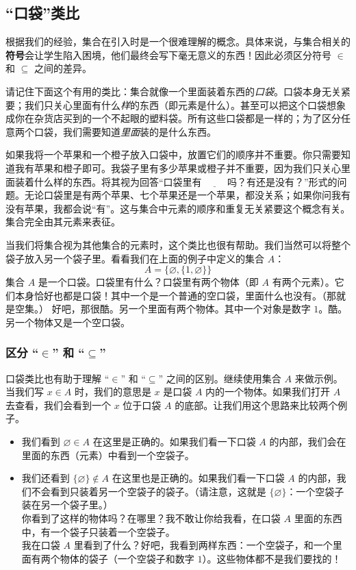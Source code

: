 \subsection{``口袋''类比}\label{sec:section3.4.4}

根据我们的经验，集合在引入时是一个很难理解的概念。具体来说，与集合相关的\textbf{符号}会让学生陷入困境，他们最终会写下毫无意义的东西！因此必须区分符号 $\in$ 和 $\subseteq$ 之间的差异。

请记住下面这个有用的类比：集合就像一个里面装着东西的\emph{口袋}。口袋本身无关紧要；我们只关心里面有什么\emph{样}的东西（即元素是什么）。甚至可以把这个口袋想象成你在杂货店买到的一个不起眼的塑料袋。所有这些口袋都是一样的；为了区分任意两个口袋，我们需要知道\emph{里面}装的是什么东西。

如果我将一个苹果和一个橙子放入口袋中，放置它们的顺序并不重要。你只需要知道我有苹果和橙子即可。我袋子里有多少苹果或橙子并不重要，因为我们只关心里面装着什么样的东西。将其视为回答``口袋里有 $\underline{\qquad}$ 吗？有还是没有？''形式的问题。无论口袋里是有两个苹果、七个苹果还是一个苹果，都没关系；如果你问我有没有苹果，我都会说``有''。这与集合中元素的顺序和重复无关紧要这个概念有关。集合完全由其元素来表征。

当我们将集合视为其他集合的元素时，这个类比也很有帮助。我们当然可以将整个袋子放入另一个袋子里。看看我们在上面的例子中定义的集合 $A$：
\[A = \{\varnothing, \{1, \varnothing\}\}\]
集合 $A$ 是一个口袋。口袋里有什么？口袋里有两个物体（即 $A$ 有两个元素）。它们本身恰好也都是口袋！其中一个是一个普通的空口袋，里面什么也没有。（那就是空集。） 好吧，那很酷。另一个里面有两个物体。其中一个对象是数字 $1$。酷。另一个物体又是一个空口袋。

\subsubsection*{区分 ``$\in$'' 和 ``$\subseteq$''}

口袋类比也有助于理解 ``$\in$'' 和 ``$\subseteq$'' 之间的区别。继续使用集合 $A$ 来做示例。当我们写 $x \in A$ 时，我们的意思是 $x$ 是口袋 $A$ 内的一个物体。如果我们打开 $A$ 去查看，我们会看到一个 $x$ 位于口袋 $A$ 的底部。让我们用这个思路来比较两个例子。

\begin{itemize}
    \item 我们看到 $\varnothing \in A$ 在这里是正确的。如果我们看一下口袋 $A$ 的内部，我们会在里面的东西（元素）中看到一个空袋子。
    \item 我们还看到 $\{\varnothing\} \notin A$ 在这里也是正确的。如果我们看一下口袋 $A$ 的内部，我们不会看到只装着另一个空袋子的袋子。（请注意，这就是 $\{\varnothing\}$：一个空袋子装在另一个袋子里。）\\
    你看到了这样的物体吗？在哪里？我不敢让你给我看，在口袋 $A$ 里面的东西中，有一个袋子只装着一个空袋子。\\
    我在口袋 $A$ 里看到了什么？好吧，我看到两样东西：一个空袋子，和一个里面有两个物体的袋子（一个空袋子和数字 $1$）。这些物体都不是我们要找的！
\end{itemize}

